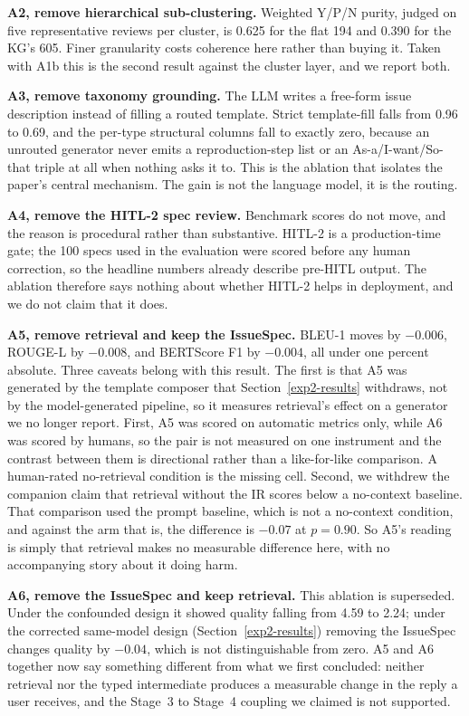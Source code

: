 \documentclass[sigconf, anonymous]{acmart}
\begin{document}
  \textbf{A2, remove hierarchical sub-clustering.} Weighted Y/P/N purity, judged on five
  representative reviews per cluster, is 0.625 for the flat 194 and 0.390 for the KG's 605. Finer
  granularity costs coherence here rather than buying it. Taken with A1b this is the second
  result against the cluster layer, and we report both.

  \textbf{A3, remove taxonomy grounding.} The LLM writes a free-form issue description instead of
  filling a routed template. Strict template-fill falls from 0.96 to 0.69, and the per-type
  structural columns fall to exactly zero, because an unrouted generator never emits a
  reproduction-step list or an As-a/I-want/So-that triple at all when nothing asks it to. This is
  the ablation that isolates the paper's central mechanism. The gain is not the language model,
  it is the routing.

  \textbf{A4, remove the HITL-2 spec review.} Benchmark scores do not move, and the reason is
  procedural rather than substantive. HITL-2 is a production-time gate; the 100 specs used in the
  evaluation were scored before any human correction, so the headline numbers already describe
  pre-HITL output. The ablation therefore says nothing about whether HITL-2 helps in deployment,
  and we do not claim that it does.

  \textbf{A5, remove retrieval and keep the IssueSpec.} BLEU-1 moves by $-0.006$, ROUGE-L by
  $-0.008$, and BERTScore F1 by $-0.004$, all under one percent absolute. Three caveats belong with
  this result. The first is that A5 was generated by the template composer that Section~\ref{exp2-results}
  withdraws, not by the model-generated pipeline, so it measures retrieval's effect on a generator
  we no longer report. First, A5 was scored on automatic metrics only, while A6 was scored by humans, so
  the pair is not measured on one instrument and the contrast between them is directional rather
  than a like-for-like comparison. A human-rated no-retrieval condition is the missing cell.
  Second, we withdrew the companion claim that retrieval without the IR scores below a
  no-context baseline. That comparison used the prompt baseline, which is not a no-context
  condition, and against the arm that is, the difference is $-0.07$ at $p = 0.90$. So A5's
  reading is simply that retrieval makes no measurable difference here, with no accompanying
  story about it doing harm.

  \textbf{A6, remove the IssueSpec and keep retrieval.} This ablation is superseded. Under the
  confounded design it showed quality falling from 4.59 to 2.24; under the corrected same-model
  design (Section~\ref{exp2-results}) removing the IssueSpec changes quality by $-0.04$, which is
  not distinguishable from zero. A5 and A6 together now say something different from what we
  first concluded: neither retrieval nor the typed intermediate produces a measurable change in
  the reply a user receives, and the Stage~3 to Stage~4 coupling we claimed is not supported.
\end{document}
